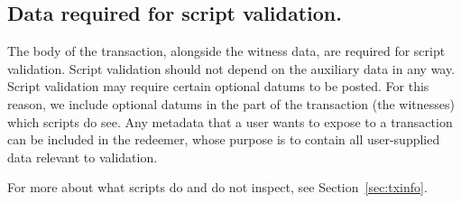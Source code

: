 \subsection{Data required for script validation.}
\label{sec:script-data}

The body of the transaction, alongside the witness data, are required for script validation.
Script validation should not depend on the auxiliary data in any way. Script validation
may require certain optional datums to be posted. For this reason, we include optional
datums in the part of the transaction (the witnesses) which scripts do see.
Any metadata that a user wants to expose to a transaction can be included in the
redeemer, whose purpose is to contain all user-supplied data relevant to validation.

For more about what scripts do and do not inspect, see Section~\ref{sec:txinfo}.
